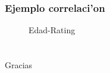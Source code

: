 \documentclass{beamer}
\begin{document}
\begin{frame}[label=bivar]
\frametitle{Ejemplo correlaci'on}
\begin{figure}[h]
    \begin{center}
    \hspace{0.01cm}
    \caption{Edad-Rating}
   \end{center}
\end{figure}
\end{frame}
\section*{}
\begin{frame}[label=last]
\frametitle{}

\begin{center}
Gracias
\end{center}

\end{frame}



\end{document}
